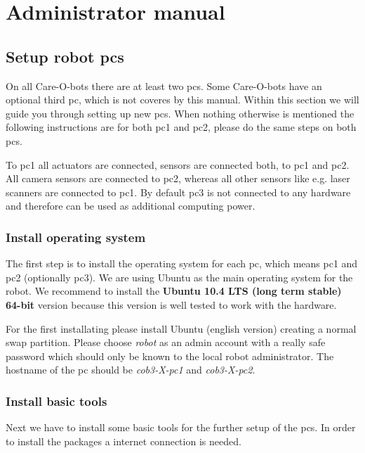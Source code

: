 \chapter{Administrator manual}
\label{chap:admin}

\section{Setup robot pcs}
On all Care-O-bots there are at least two pcs. Some Care-O-bots have an optional third pc, which is not coveres by this manual. Within this section we will guide you through setting up new pcs. When nothing otherwise is mentioned the following instructions are for both pc1 and pc2, please do the same steps on both pcs.

To pc1 all actuators are connected, sensors are connected both, to pc1 and pc2. All camera sensors are connected to pc2, whereas all other sensors like e.g. laser scanners are connected to pc1. By default pc3 is not connected to any hardware and therefore can be used as additional computing power.

\subsection{Install operating system}
The first step is to install the operating system for each pc, which means pc1 and pc2 (optionally pc3). We are using Ubuntu as the main operating system for the robot. We recommend to install the \textbf{Ubuntu 10.4 LTS (long term stable) 64-bit} version because this version is well tested to work with the hardware. 

For the first installating please install Ubuntu (english version) creating a normal swap partition. Please choose \textit{robot} as an admin account with a really safe password which should only be known to the local robot administrator. The hostname of the pc should be \textit{cob3-X-pc1} and \textit{cob3-X-pc2}.

\subsection{Install basic tools}
Next we have to install some basic tools for the further setup of the pcs. In order to install the packages a internet connection is needed.

